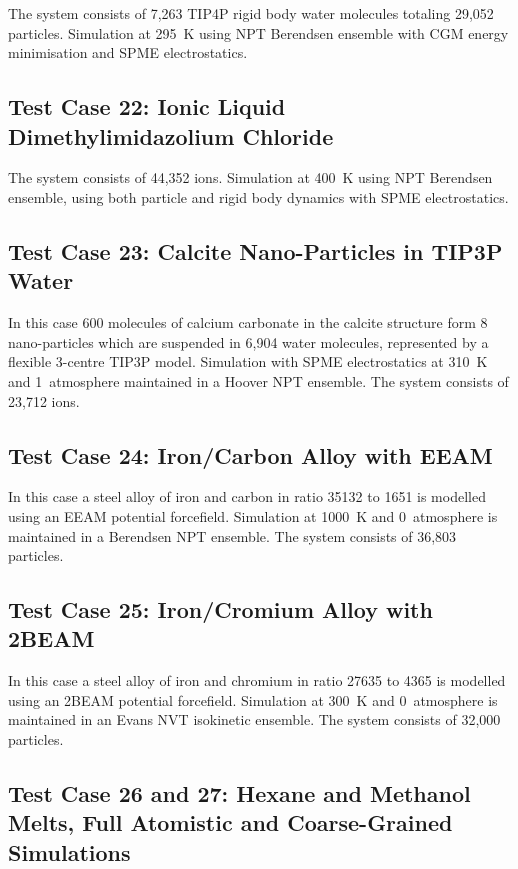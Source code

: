 The system consists of 7,263 TIP4P rigid body water molecules totaling
29,052 particles.  Simulation at 295~K using NPT Berendsen ensemble with
CGM energy minimisation and SPME electrostatics.

\subsection{Test Case 22: Ionic Liquid Dimethylimidazolium Chloride}

The system consists of 44,352 ions.  Simulation at 400~K using NPT
Berendsen ensemble, using both particle and rigid body dynamics with SPME electrostatics.

\subsection{Test Case 23: Calcite Nano-Particles in TIP3P Water}

In this case 600 molecules of calcium carbonate in the calcite
structure form 8 nano-particles which are suspended in 6,904 water
molecules, represented by a flexible 3-centre TIP3P model.  Simulation
with SPME electrostatics at 310~K and 1~atmosphere maintained in
a Hoover NPT ensemble.  The system consists of 23,712 ions.

\subsection{Test Case 24: Iron/Carbon Alloy with EEAM}

In this case a steel alloy of iron and carbon in ratio
35132 to 1651 is modelled using an EEAM potential forcefield.
Simulation at 1000~K and 0~atmosphere is maintained in a
Berendsen NPT ensemble.  The system consists of 36,803 particles.

\subsection{Test Case 25: Iron/Cromium Alloy with 2BEAM}

In this case a steel alloy of iron and chromium in ratio
27635 to 4365 is modelled using an 2BEAM potential forcefield.
Simulation at 300~K and 0~atmosphere is maintained in an Evans NVT
isokinetic ensemble.  The system consists of 32,000 particles.

\subsection{Test Case 26 and 27: Hexane and Methanol Melts,
Full Atomistic and Coarse-Grained Simulations}

